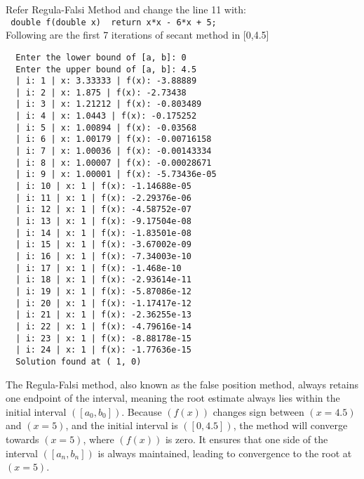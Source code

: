 \documentclass[a4paper]{article}
\begin{document}
\begin{answer}
	Refer Regula-Falsi Method and change the line 11 with: \\
	\texttt{ double f(double x) { return x*x - 6*x + 5; }} \\

	Following are the first 7 iterations of secant method in [0,4.5]
	\begin{verbatim}
  Enter the lower bound of [a, b]: 0
  Enter the upper bound of [a, b]: 4.5
  | i: 1 | x: 3.33333 | f(x): -3.88889
  | i: 2 | x: 1.875 | f(x): -2.73438
  | i: 3 | x: 1.21212 | f(x): -0.803489
  | i: 4 | x: 1.0443 | f(x): -0.175252
  | i: 5 | x: 1.00894 | f(x): -0.03568
  | i: 6 | x: 1.00179 | f(x): -0.00716158
  | i: 7 | x: 1.00036 | f(x): -0.00143334
  | i: 8 | x: 1.00007 | f(x): -0.00028671
  | i: 9 | x: 1.00001 | f(x): -5.73436e-05
  | i: 10 | x: 1 | f(x): -1.14688e-05
  | i: 11 | x: 1 | f(x): -2.29376e-06
  | i: 12 | x: 1 | f(x): -4.58752e-07
  | i: 13 | x: 1 | f(x): -9.17504e-08
  | i: 14 | x: 1 | f(x): -1.83501e-08
  | i: 15 | x: 1 | f(x): -3.67002e-09
  | i: 16 | x: 1 | f(x): -7.34003e-10
  | i: 17 | x: 1 | f(x): -1.468e-10
  | i: 18 | x: 1 | f(x): -2.93614e-11
  | i: 19 | x: 1 | f(x): -5.87086e-12
  | i: 20 | x: 1 | f(x): -1.17417e-12
  | i: 21 | x: 1 | f(x): -2.36255e-13
  | i: 22 | x: 1 | f(x): -4.79616e-14
  | i: 23 | x: 1 | f(x): -8.88178e-15
  | i: 24 | x: 1 | f(x): -1.77636e-15
  Solution found at ( 1, 0)
\end{verbatim}
	The Regula-Falsi method, also known as the false position method, always retains one endpoint of the interval,
	meaning the root estimate always lies within the initial interval $([a_0, b_0])$. Because $( f(x) )$ changes sign
	between $( x = 4.5 )$ and $( x = 5 )$, and the initial interval is $([0, 4.5])$, the method will converge towards
	$( x = 5 )$, where $( f(x) )$ is zero. It ensures that one side of the interval $( [a_n, b_n] )$ is always
	maintained, leading to convergence to the root at $( x = 5 )$.
\end{answer}
\end{document}
